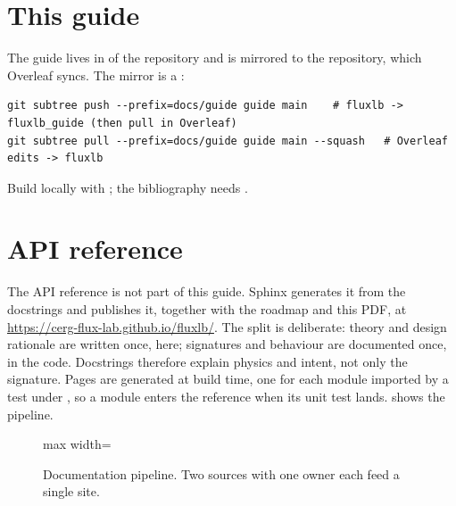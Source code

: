 \section{This guide}

The guide lives in  of the  repository and is mirrored to the
 repository, which Overleaf syncs. The mirror is a :
\begin{lstlisting}[style=sh]
git subtree push --prefix=docs/guide guide main    # fluxlb -> fluxlb_guide (then pull in Overleaf)
git subtree pull --prefix=docs/guide guide main --squash   # Overleaf edits -> fluxlb
\end{lstlisting}
Build locally with ; the bibliography needs .

\section{API reference}

The API reference is not part of this guide. Sphinx generates it from the docstrings and
publishes it, together with the roadmap and this PDF, at
\url{https://cerg-flux-lab.github.io/fluxlb/}. The split is deliberate: theory and design
rationale are written once, here; signatures and behaviour are documented once, in the code.
Docstrings therefore explain physics and intent, not only the signature. Pages are generated
at build time, one for each module imported by a test under , so a module
enters the reference when its unit test lands.  shows the pipeline.

\begin{figure}[h]
\centering
\begin{adjustbox}{max width=\linewidth}\end{adjustbox}
\caption{Documentation pipeline. Two sources with one owner each feed a single site.}
\label{fig:docs}
\end{figure}
